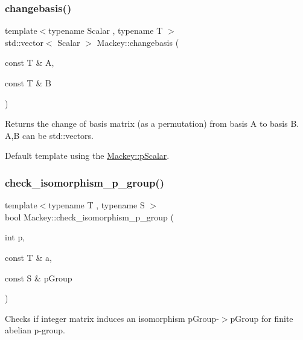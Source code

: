 \subsubsection{\texorpdfstring{changebasis()}{changebasis()}}
{\footnotesize\ttfamily template$<$typename Scalar , typename T $>$ \\
std\+::vector$<$ Scalar $>$ Mackey\+::changebasis (\begin{DoxyParamCaption}\item[{const T \&}]{A,  }\item[{const T \&}]{B }\end{DoxyParamCaption})}



Returns the change of basis matrix (as a permutation) from basis A to basis B. A,B can be std\+::vector\textquotesingle{}s. 

Default template using the \hyperlink{namespaceMackey_a4f147e328c520f568f5d3adf1c75f514}{Mackey\+::p\+Scalar}. \mbox{\label{namespaceMackey_aa96cf972d89b207ce6709e867f760f37}} 
\subsubsection{\texorpdfstring{check\+\_\+isomorphism\+\_\+p\+\_\+group()}{check\_isomorphism\_p\_group()}}
{\footnotesize\ttfamily template$<$typename T , typename S $>$ \\
bool Mackey\+::check\+\_\+isomorphism\+\_\+p\+\_\+group (\begin{DoxyParamCaption}\item[{int}]{p,  }\item[{const T \&}]{a,  }\item[{const S \&}]{p\+Group }\end{DoxyParamCaption})}



Checks if integer matrix induces an isomorphism p\+Group-\/$>$p\+Group for finite abelian p-\/group. 

